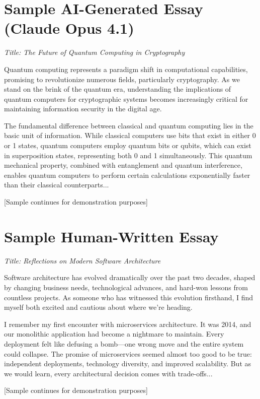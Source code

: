 \documentclass[12pt,a4paper]{report}
\begin{document}
\section{Sample AI-Generated Essay (Claude Opus 4.1)}

\textit{Title: The Future of Quantum Computing in Cryptography}

Quantum computing represents a paradigm shift in computational capabilities, promising to revolutionize numerous fields, particularly cryptography. As we stand on the brink of the quantum era, understanding the implications of quantum computers for cryptographic systems becomes increasingly critical for maintaining information security in the digital age.

The fundamental difference between classical and quantum computing lies in the basic unit of information. While classical computers use bits that exist in either 0 or 1 states, quantum computers employ quantum bits or qubits, which can exist in superposition states, representing both 0 and 1 simultaneously. This quantum mechanical property, combined with entanglement and quantum interference, enables quantum computers to perform certain calculations exponentially faster than their classical counterparts...

[Sample continues for demonstration purposes]

\section{Sample Human-Written Essay}

\textit{Title: Reflections on Modern Software Architecture}

Software architecture has evolved dramatically over the past two decades, shaped by changing business needs, technological advances, and hard-won lessons from countless projects. As someone who has witnessed this evolution firsthand, I find myself both excited and cautious about where we're heading.

I remember my first encounter with microservices architecture. It was 2014, and our monolithic application had become a nightmare to maintain. Every deployment felt like defusing a bomb—one wrong move and the entire system could collapse. The promise of microservices seemed almost too good to be true: independent deployments, technology diversity, and improved scalability. But as we would learn, every architectural decision comes with trade-offs...

[Sample continues for demonstration purposes]
\end{document}
